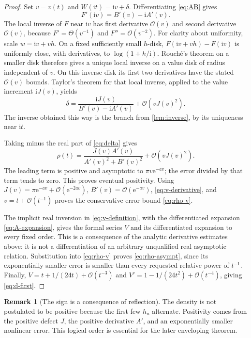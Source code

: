 \documentclass[11pt,a4paper]{article}
\theoremstyle{definition}
\newtheorem{remark}[theorem]{Remark}
\numberwithin{equation}{section}
\newcommand{\ii}{\mathrm{i}}
\newcommand{\ee}{\mathrm{e}}
\newcommand{\Oh}{\mathcal O}
\begin{document}
\begin{proof}
Set $v=v(t)$ and $W(\ii t)=\ii v+\delta$. Differentiating \eqref{eq:AB} gives
\begin{equation}
 F'(\ii v)=B'(v)-\ii A'(v).
 \label{eq:Fprime-boundary}
\end{equation}
The local inverse of $F$ near $\ii v$ has first derivative $\Oh(v)$ and second derivative $\Oh(v)$, because $F'=\Theta(v^{-1})$ and $F''=\Oh(v^{-2})$. For clarity about uniformity, scale $w=\ii v+vh$. On a fixed sufficiently small $h$-disk, $F(\ii v+vh)-F(\ii v)$ is uniformly close, with derivatives, to $\log(1+h/\ii)$. Rouch\'e's theorem on a smaller disk therefore gives a unique local inverse on a value disk of radius independent of $v$. On this inverse disk its first two derivatives have the stated $\Oh(v)$ bounds. Taylor's theorem for that local inverse, applied to the value increment $\ii J(v)$, yields
\begin{equation}
 \delta=\frac{\ii J(v)}{B'(v)-\ii A'(v)}+\Oh(vJ(v)^2).
 \label{eq:delta}
\end{equation}
The inverse obtained this way is the branch from \cref{lem:inverse}, by its uniqueness near $\ii t$.

Taking minus the real part of \eqref{eq:delta} gives
\begin{equation}
 \rho(t)=\frac{J(v)A'(v)}{A'(v)^2+B'(v)^2}+\Oh(vJ(v)^2).
 \label{eq:rho-exact-leading}
\end{equation}
The leading term is positive and asymptotic to $\pi v\ee^{-av}$; the error divided by that term tends to zero. This proves eventual positivity. Using
$J(v)=\pi\ee^{-av}+\Oh(\ee^{-2av})$,
$B'(v)=\Oh(\ee^{-av})$, \eqref{eq:v-derivative}, and $v=t+\Oh(t^{-1})$ proves the conservative error bound \eqref{eq:rho-v}.

The implicit real inversion in \eqref{eq:v-definition}, with the differentiated expansion \eqref{eq:A-expansion}, gives the formal series $V$ and its differentiated expansion to every fixed order. This is a consequence of the analytic derivative estimates above; it is not a differentiation of an arbitrary unqualified real asymptotic relation. Substitution into \eqref{eq:rho-v} proves \eqref{eq:rho-asympt}, since its exponentially smaller error is smaller than every requested relative power of $t^{-1}$. Finally,
$V=t+1/(24t)+\Oh(t^{-3})$ and
$V'=1-1/(24t^2)+\Oh(t^{-4})$, giving \eqref{eq:d-first}.
\end{proof}

\begin{remark}[The sign is a consequence of reflection]
The density is not postulated to be positive because the first few $h_n$ alternate. Positivity comes from the positive defect $J$, the positive derivative $A'$, and an exponentially smaller nonlinear error. This logical order is essential for the later enveloping theorem.
\end{remark}
\end{document}
